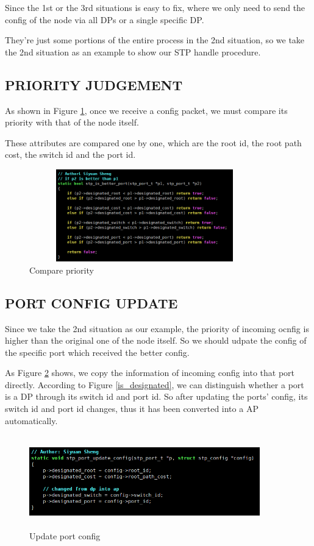 \documentclass{article}
\begin{document}
Since the 1st or the 3rd situations is easy to fix, where we only need to send the config of the node via all DPs or a single specific DP.

They're just some portions of the entire process in the 2nd situation, so we take the 2nd situation as an example to show our STP handle procedure.

\subsection{PRIORITY JUDGEMENT}

As shown in Figure \ref{compare_priority}, once we receive a config packet, we must compare its priority with that of the node itself.

These attributes are compared one by one, which are the root id, the root path cost, the switch id and the port id.

\begin{figure}
	\centering
	\includegraphics[width=10cm, height=4cm]{compare_priority.png}
	\caption{Compare priority}
	\label{compare_priority}
\end{figure}

\subsection{PORT CONFIG UPDATE}

Since we take the 2nd situation as our example, the priority of incoming ocnfig is higher than the original one of the node itself. So we should udpate the config of the specific port which received the better config.

As Figure \ref{port_update_config} shows, we copy the information of incoming config into that port directly.
According to Figure \ref{is_designated}, we can distinguish whether a port is a DP through its switch id and port id. So after updating the ports' config, its switch id and port id changes, thus it has been converted into a AP automatically.

\begin{figure}
	\centering
	\includegraphics[width=10cm, height=4cm]{port_update_config.png}
	\caption{Update port config}
	\label{port_update_config}
\end{figure}
\end{document}
